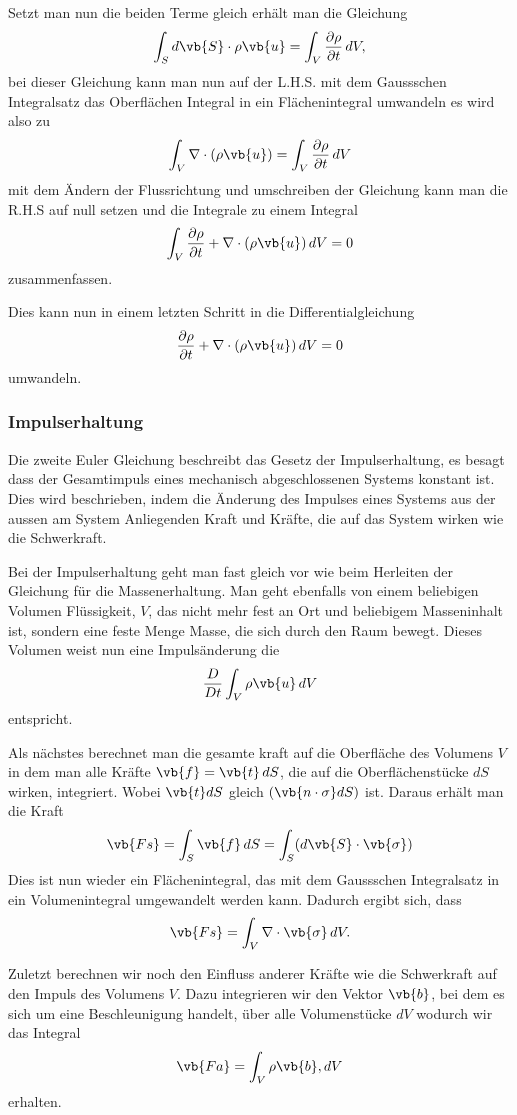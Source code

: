 Setzt man nun die beiden Terme gleich erhält man die Gleichung 
\[\int_{S}d\vb{S}\cdot\rho\vb{u} 
=
\int_{V}\frac{\partial \rho}{\partial t} \, dV ,\] 
bei dieser Gleichung kann man nun auf der L.H.S. mit dem Gaussschen Integralsatz das Oberflächen Integral in ein Flächenintegral umwandeln es wird also zu
\[\int_{V}\nabla\cdot(\rho\vb{u}) 
=
\int_{V}\frac{\partial \rho}{\partial t} \, dV \]
mit dem Ändern der Flussrichtung und umschreiben der Gleichung kann man die R.H.S auf null setzen und die Integrale zu einem Integral
\[\int_{V}\frac{\partial \rho}{\partial t} + \nabla\cdot(\rho\vb{u})  \, dV 
= 
0\]
zusammenfassen.

Dies kann nun in einem letzten Schritt in die Differentialgleichung
\begin{equation}
\label{openfoam:euler1}
\frac{\partial \rho}{\partial t} + \nabla\cdot(\rho\vb{u})  \, dV 
= 
0
\end{equation}
umwandeln.

\subsubsection{Impulserhaltung}
Die zweite Euler Gleichung beschreibt das Gesetz der Impulserhaltung, es besagt dass der Gesamtimpuls eines mechanisch abgeschlossenen Systems konstant ist.
Dies wird beschrieben, indem die Änderung des Impulses eines Systems aus der aussen am System Anliegenden Kraft und Kräfte, die auf das System wirken wie die Schwerkraft.

Bei der Impulserhaltung geht man fast gleich vor wie beim Herleiten der Gleichung für die Massenerhaltung.
Man geht ebenfalls von einem beliebigen Volumen Flüssigkeit, $V$, das nicht mehr fest an Ort und beliebigem Masseninhalt ist, sondern eine feste Menge Masse, die sich durch den Raum bewegt.
Dieses Volumen weist nun eine Impulsänderung die
\[\frac{D}{Dt}\int_{V}\rho\vb{u}\, dV\]
entspricht.

Als nächstes berechnet man die gesamte kraft auf die Oberfläche des Volumens $V$ in dem man alle Kräfte $\vb{f} = \vb{t}\,dS$, die auf die Oberflächenstücke $dS$ wirken, integriert.
Wobei $\vb{t} dS$ gleich $(\vb{n\cdot\sigma}dS)$ ist. 
Daraus erhält man die Kraft 
\[\vb{Fs} 
=
\int_{S}\vb{f}\, dS
= \int_{S} (d\vb{S}\cdot\vb{\sigma})
\]
Dies ist nun wieder ein Flächenintegral, das mit dem Gaussschen Integralsatz in ein Volumenintegral umgewandelt werden kann.
Dadurch ergibt sich, dass
\[\vb{Fs} 
=
\int_{V}\nabla \cdot \vb{\sigma}\, dV
.\]

Zuletzt berechnen wir noch den Einfluss anderer Kräfte wie die Schwerkraft auf den Impuls des Volumens $V$.
Dazu integrieren wir den Vektor $\vb{b}$, bei dem es sich um eine Beschleunigung handelt, über alle Volumenstücke $dV$ wodurch wir das Integral
\[\vb{Fa} 
=
\int_{V}\rho\vb{b}, dV
\]
erhalten.

